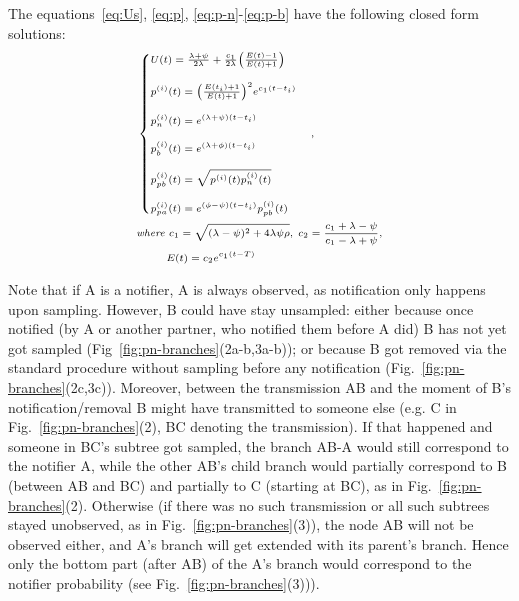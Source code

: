 \documentclass[10pt,letterpaper]{article}
\begin{document}
The equations~\ref{eq:Us}, \ref{eq:p}, \ref{eq:p-n}-\ref{eq:p-b} have the following closed form solutions:
\begin{equation}
\scriptsize
\begin{split}
&\begin{cases}
U(t) = \frac{\lambda + \psi}{2\lambda} +  \frac{c_1}{2\lambda}\Big(\frac{E(t) - 1}{E(t) + 1}\Big)\\
\\
p^{(i)}(t) = \Big(\frac{E(t_i) + 1}{E(t) + 1}\Big)^2 e^{c_1 (t -t_i)} \\
\\
p_n^{(i)}(t) =  e^{(\lambda + \psi) (t -t_i)}\\
\\
p_b^{(i)}(t) =  e^{(\lambda + \phi) (t -t_i)}
\\
\\
p_{pb}^{(i)}(t) =  \sqrt{p^{(i)}(t)p_n^{(i)}(t)} \\
\\
p_{pa}^{(i)}(t) =  e^{(\phi-\psi) (t -t_i)} p_{pb}^{(i)}(t) 
\end{cases},\\
& \textit{where } c_1 = \sqrt{(\lambda - \psi)^2 + 4 \lambda\psi\rho},\; c_2 = \frac{c_1 + \lambda - \psi}{c_1 - \lambda + \psi},\\
& ~~~~~~~~E(t) = c_2 e^{c_1 (t -T)} \\
\end{split}\label{eq:ps}
\end{equation}


Note that if A is a notifier, A is always observed, as notification only happens upon sampling. However, B could have stay unsampled: either because once notified (by A or another partner, who notified them before A did) B has not yet got sampled (Fig~\ref{fig:pn-branches}(2a-b,3a-b)); or because B got removed via the standard procedure without sampling before any notification (Fig.~\ref{fig:pn-branches}(2c,3c)). Moreover, between the transmission AB and the moment of B's notification/removal B might have transmitted to someone else (e.g. C in Fig.~\ref{fig:pn-branches}(2), BC denoting the transmission). If that happened and someone in BC's subtree got sampled, the branch AB-A would still correspond to the notifier A, while the other AB's child branch would partially correspond to B (between AB and BC) and partially to C (starting at BC), as in Fig.~\ref{fig:pn-branches}(2). Otherwise (if there was no such transmission or all such subtrees stayed unobserved, as in Fig.~\ref{fig:pn-branches}(3)), the node AB will not be observed either, and A's branch will get extended with its parent's branch. Hence only the bottom part (after AB) of the A's branch would correspond to the notifier probability (see Fig.~\ref{fig:pn-branches}(3))).
\end{document}

